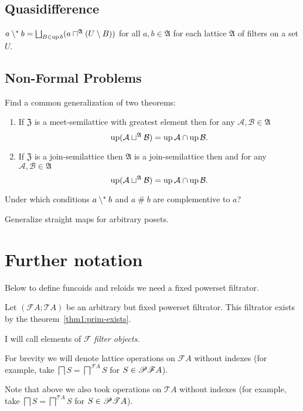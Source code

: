 \subsection{Quasidifference}
\begin{conjecture}
$a\setminus^{\ast} b=\bigsqcup_{B\in\operatorname{up} b}(a\sqcap^{\mathfrak{A}}(U\setminus B))$
for all $a,b\in\mathfrak{A}$ for each lattice $\mathfrak{A}$ of
filters on a set $U$.
\end{conjecture}

\subsection{Non-Formal Problems}

Find a common generalization of two theorems:
\begin{enumerate}
\item If $\mathfrak{Z}$ is a meet-semilattice with greatest element then
for any $\mathcal{A},\mathcal{B}\in\mathfrak{A}$
\[
\operatorname{up}(\mathcal{A}\sqcup^{\mathfrak{A}}\mathcal{B})=\operatorname{up}\mathcal{A}\cap\operatorname{up}\mathcal{B}.
\]

\item If $\mathfrak{Z}$ is a join-semilattice then $\mathfrak{A}$ is a
join-semilattice then and for any $\mathcal{A},\mathcal{B}\in\mathfrak{A}$
\[
\operatorname{up}(\mathcal{A}\sqcup^{\mathfrak{A}}\mathcal{B})=\operatorname{up}\mathcal{A}\cap\operatorname{up}\mathcal{B}.
\]

\end{enumerate}
Under which conditions $a\setminus^{\ast} b$ and $a\mathop\#b$ are complementive
to $a$?

Generalize straight maps for arbitrary posets.


\section{Further notation}

Below to define funcoids and reloids we need a fixed powerset filtrator.

Let $(\mathscr{F}A;\mathscr{T}A)$ be an arbitrary but fixed powerset
filtrator. This filtrator exists by the theorem~\ref{thm1:prim-exists}.

I will call elements of $\mathscr{F}$ \emph{filter
objects}.

For brevity we will denote lattice operations on $\mathscr{F}A$ without
indexes (for example, take $\bigsqcap S=\bigsqcap^{\mathscr{F}A}S$
for $S\in\mathscr{P}\mathscr{F}A$).

Note that above we also took operations on $\mathscr{T}A$ without
indexes (for example, take $\bigsqcap S=\bigsqcap^{\mathscr{T}A}S$
for $S\in\mathscr{P}\mathscr{T}A$).

